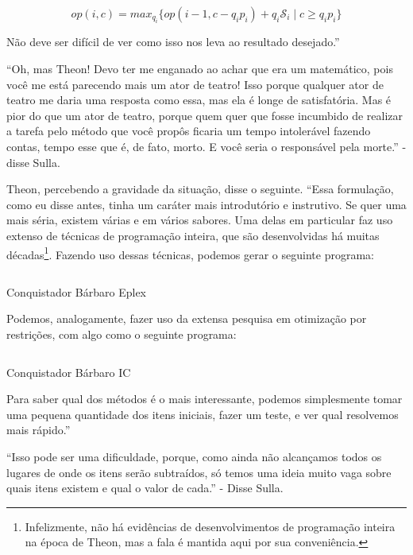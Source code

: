 \documentclass{article}
\begin{document}
\[
  op(i,c) =
    max_{q_i}\{op(i-1, c-q_i p_i) + q_i \mathscr{S}_i\; |\; c \geq q_i p_i\}
\]

Não deve ser difícil de ver como isso nos leva ao resultado desejado.''

``Oh, mas Theon! Devo ter me enganado ao achar que era um matemático, pois você me está parecendo
  mais um ator de teatro! Isso porque qualquer ator de teatro me daria uma resposta como essa, mas
  ela é longe de satisfatória. Mas é pior do que um ator de teatro, porque quem quer que fosse
  incumbido de realizar a tarefa pelo método que você propôs ficaria um tempo intolerável fazendo
  contas, tempo esse que é, de fato, morto. %
  E você seria o responsável pela morte.'' - disse Sulla.

  Theon, percebendo a gravidade da situação, disse o seguinte. ``Essa formulação, como eu disse
  antes, tinha um caráter mais introdutório e instrutivo. Se quer uma mais séria, existem várias e
  em vários sabores. Uma delas em particular faz uso extenso de técnicas de programação inteira, que
  são desenvolvidas há muitas décadas\footnote{Infelizmente, não há evidências de desenvolvimentos de
  programação inteira na época de Theon, mas a fala é mantida aqui por sua conveniência.}. Fazendo
  uso dessas técnicas, podemos gerar o seguinte programa:

  \begin{listing}
    \inputminted{prolog}{../Exemplos/Cap12/prog1-knapSackEplex.ecl}
    \caption{Conquistador Bárbaro Eplex}\label{lst:knapsackEplex}
  \end{listing}

  Podemos, analogamente, fazer uso da extensa pesquisa em otimização por restrições, com algo como o
  seguinte programa:

  \begin{listing}[H]
    \inputminted{prolog}{../Exemplos/Cap12/prog2-knapSackIc.ecl}
    \caption{Conquistador Bárbaro IC}\label{lst:knapsackIC}
  \end{listing}

  Para saber qual dos métodos é o mais interessante, podemos simplesmente tomar uma pequena quantidade dos itens
  iniciais, fazer um teste, e ver qual resolvemos mais rápido.''

  ``Isso pode ser uma dificuldade, porque, como ainda não alcançamos todos os lugares de onde os
  itens serão subtraídos, só temos uma ideia muito vaga sobre quais itens existem e qual o valor de
  cada.'' - Disse Sulla.
\end{document}
